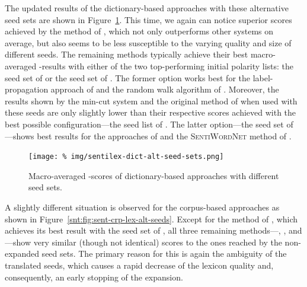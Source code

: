 The updated results of the dictionary-based approaches with these
alternative seed sets are shown in
Figure~\ref{snt:fig:sent-dict-lex-alt-seeds}.  This time, we again can
notice superior scores achieved by the method of
\citet{Blair-Goldensohn:08}, which not only outperforms other systems
on average, but also seems to be less susceptible to the varying
quality and size of different seeds.  The remaining methods typically
achieve their best macro-averaged \F{}-results with either of the two
top-performing initial polarity lists: the seed set of \citet{Kim:04}
or the seed set of \citet{Esuli:06c}.  The former option works best
for the label-propagation approach of \citet{Rao:09} and the random
walk algorithm of \citet{Awadallah:10}.  Moreover, the results shown
by the min-cut system \cite{Rao:09} and the original method of
\citet{Kim:04} when used with these seeds are only slightly lower than
their respective scores achieved with the best possible
configuration---the seed list of \citet{Turney:02}.  The latter
option---the seed set of \citet{Esuli:06c}---shows best results for
the approaches of \citet{Hu:04} and the \textsc{SentiWordNet} method
of \citet{Esuli:06c}.

\begin{figure}[hbtp]
  \centering
  \texttt{[image: \%
    img/sentilex-dict-alt-seed-sets.png]}
  \caption{Macro-averaged \F{}-scores of dictionary-based approaches
    with different seed sets.}\label{snt:fig:sent-dict-lex-alt-seeds}
\end{figure}

A slightly different situation is observed for the corpus-based
approaches as shown in Figure~\ref{snt:fig:sent-crp-lex-alt-seeds}.
Except for the method of \citet{Takamura:05}, which achieves its best
result with the seed set of \citet{Hu:04}, all three remaining
methods---\citet{Velikovich:10}, \citet{Kiritchenko:14}, and
\citet{Severyn:15}---show very similar (though not identical) scores
to the ones reached by the non-expanded seed sets.  The primary reason
for this is again the ambiguity of the translated seeds, which causes
a rapid decrease of the lexicon quality and, consequently, an early
stopping of the expansion.

